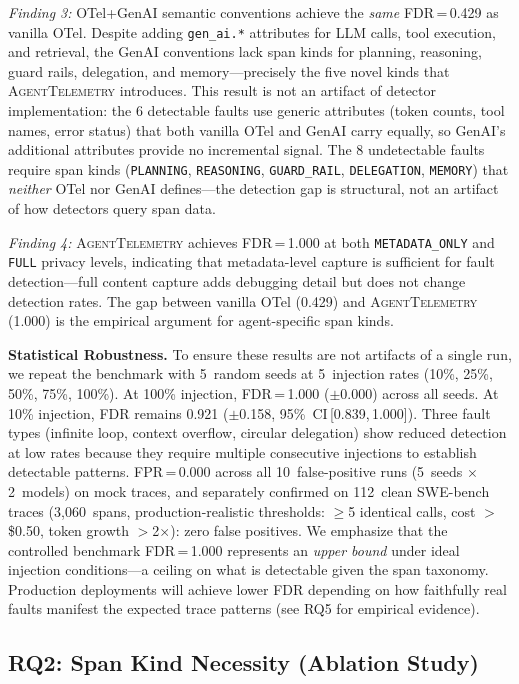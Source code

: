 \documentclass[sigplan,10pt,screen]{acmart}
\begin{document}
\emph{Finding 3:} OTel+GenAI semantic conventions achieve the \emph{same}
FDR\,=\,0.429 as vanilla OTel.  Despite adding \texttt{gen\_ai.*}
attributes for LLM calls, tool execution, and retrieval, the GenAI
conventions lack span kinds for planning, reasoning, guard rails,
delegation, and memory---precisely the five novel kinds that
\textsc{AgentTelemetry} introduces.
This result is not an artifact of detector implementation: the 6
detectable faults use generic attributes (token counts, tool names,
error status) that both vanilla OTel and GenAI carry equally, so
GenAI's additional attributes provide no incremental signal.  The 8
undetectable faults require span kinds (\texttt{PLANNING},
\texttt{REASONING}, \texttt{GUARD\_RAIL}, \texttt{DELEGATION},
\texttt{MEMORY}) that \emph{neither} OTel nor GenAI defines---the
detection gap is structural, not an artifact of how detectors query
span data.

\emph{Finding 4:} \textsc{AgentTelemetry} achieves FDR\,=\,1.000 at
both \texttt{METADATA\_ONLY} and \texttt{FULL} privacy levels,
indicating that metadata-level capture is sufficient for fault
detection---full content capture adds debugging detail but does not
change detection rates.  The gap between vanilla OTel (0.429) and
\textsc{AgentTelemetry} (1.000) is the empirical argument for
agent-specific span kinds.

\textbf{Statistical Robustness.}
To ensure these results are not artifacts of a single run, we repeat the
benchmark with 5~random seeds at 5~injection rates (10\%, 25\%, 50\%, 75\%,
100\%).  At 100\% injection, FDR\,=\,1.000 ($\pm$0.000) across all seeds.
At 10\% injection, FDR remains 0.921 ($\pm$0.158, 95\%~CI\,[0.839,\,1.000]).
Three fault types (infinite loop, context overflow, circular delegation) show
reduced detection at low rates because they require multiple consecutive
injections to establish detectable patterns.
FPR\,=\,0.000 across all 10~false-positive runs (5~seeds $\times$ 2~models)
on mock traces, and separately confirmed on 112~clean SWE-bench traces
(3{,}060~spans, production-realistic thresholds: $\geq$5 identical calls,
cost $>$\$0.50, token growth $>$2$\times$): zero false positives.
We emphasize that the controlled benchmark FDR\,=\,1.000 represents an
\emph{upper bound} under ideal injection conditions---a ceiling on what is
detectable given the span taxonomy.  Production deployments will achieve
lower FDR depending on how faithfully real faults manifest the expected
trace patterns (see RQ5 for empirical evidence).

\subsection{RQ2: Span Kind Necessity (Ablation Study)}
\label{sec:rq2}
\end{document}
